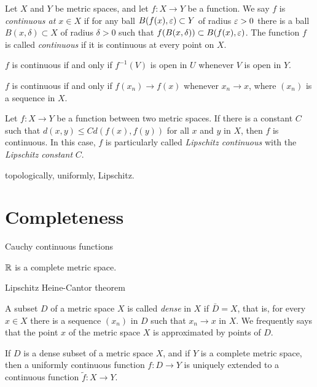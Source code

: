 \documentclass{../../large}
\begin{document}
\begin{prb}
Let $X$ and $Y$ be metric spaces, and let $f:X\to Y$ be a function.
We say $f$ is \emph{continuous at $x\in X$} if for any ball $B(f(x),\varepsilon)\subset Y$ of radius $\varepsilon>0$ there is a ball $B(x,\delta)\subset X$ of radius $\delta>0$ such that $f(B(x,\delta))\subset B(f(x),\varepsilon)$.
The function $f$ is called \emph{continuous} if it is continuous at every point on $X$.
\begin{parts}
\item $f$ is continuous if and only if $f^{-1}(V)$ is open in $U$ whenever $V$ is open in $Y$.
\item $f$ is continuous if and only if $f(x_n)\to f(x)$ whenever $x_n\to x$, where $(x_n)$ is a sequence in $X$.
\item 
Let $f:X\to Y$ be a function between two metric spaces.
If there is a constant $C$ such that $d(x,y)\le Cd(f(x),f(y))$ for all $x$ and $y$ in $X$, then $f$ is continuous.
In this case, $f$ is particularly called \emph{Lipschitz continuous} with the \emph{Lipschitz constant} $C$.
\end{parts}
\end{prb}

\begin{prb}
topologically, uniformly, Lipschitz.
\end{prb}




\section{Completeness}
\begin{prb}
Cauchy continuous functions

\begin{parts}
\item $\mathbb{R}$ is a complete metric space.
\end{parts}
\end{prb}


\begin{prb}
Lipschitz
Heine-Cantor theorem
\end{prb}


\begin{prb}
A subset $D$ of a metric space $X$ is called \emph{dense} in $X$ if $\bar D=X$, that is, for every $x\in X$ there is a sequence $(x_n)$ in $D$ such that $x_n\to x$ in $X$.
We frequently says that the point $x$ of the metric space $X$ is approximated by points of $D$.

If $D$ is a dense subset of a metric space $X$, and if $Y$ is a complete metric space, then a uniformly continuous function $f:D\to Y$ is uniquely extended to a continuous function $\tilde f:X\to Y$.
\end{prb}
\end{document}
